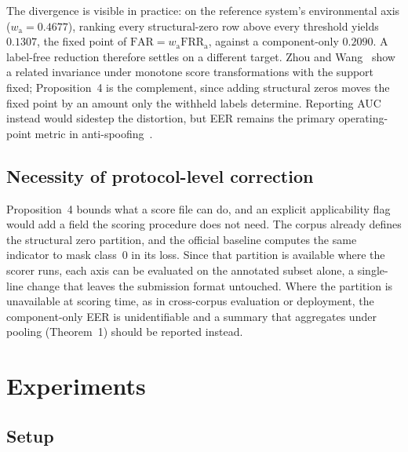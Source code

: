 \documentclass{article}
\begin{document}
\vspace{2pt}
The divergence is visible in practice: on the reference system's environmental axis ($w_{\mathrm{a}}=0.4677$), ranking every structural-zero row above every threshold yields $0.1307$, the fixed point of $\mathrm{FAR}=w_{\mathrm{a}}\mathrm{FRR}_{\mathrm{a}}$, against a component-only $0.2090$. A label-free reduction therefore settles on a different target. Zhou and Wang~\cite{zhou2026eer} show a related invariance under monotone score transformations with the support fixed; Proposition~4 is the complement, since adding structural zeros moves the fixed point by an amount only the withheld labels determine. Reporting AUC instead would sidestep the distortion, but EER remains the primary operating-point metric in anti-spoofing~\cite{asvspoof2021,asvspoof5}.

\subsection{Necessity of protocol-level correction}
\label{sec:necessity}

Proposition~4 bounds what a score file can do, and an explicit applicability flag would add a field the scoring procedure does not need. The corpus already defines the structural zero partition, and the official baseline computes the same indicator to mask class~$0$ in its loss. Since that partition is available where the scorer runs, each axis can be evaluated on the annotated subset alone, a single-line change that leaves the submission format untouched. Where the partition is unavailable at scoring time, as in cross-corpus evaluation or deployment, the component-only EER is unidentifiable and a summary that aggregates under pooling (Theorem~1) should be reported instead.

\section{Experiments}
\label{sec:exp}
\subsection{Setup}
\end{document}
